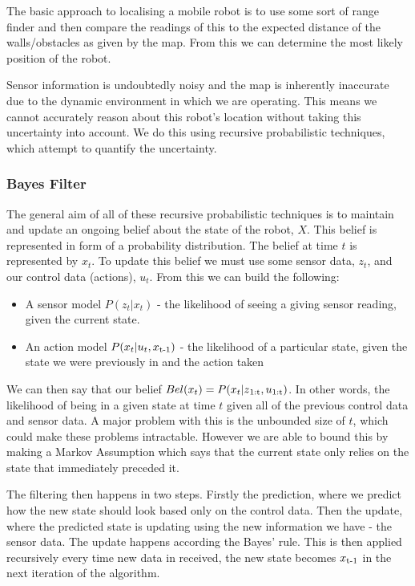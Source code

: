 The basic approach to localising a mobile robot is to use some sort of range finder and then compare the readings of this to the expected distance of the walls/obstacles as given by the map. From this we can determine the most likely position of the robot. 

Sensor information is undoubtedly noisy and the map is inherently inaccurate due to the dynamic environment in which we are operating. This means we cannot accurately reason about this robot’s location without taking this uncertainty into account. We do this using recursive probabilistic techniques, which attempt to quantify the uncertainty.
\subsubsection{Bayes Filter}

The general aim of all of these recursive probabilistic techniques is to maintain and update an ongoing belief about the state of the robot, $X$. This belief is represented in form of a probability distribution. The belief at time $t$ is represented by $x_t$. To update this belief we must use some sensor data, $z_t$, and our control data (actions), $u_t$. From this we can build the following:

\begin{itemize}
\item A sensor model $P(z_t|x_t)$ - the likelihood of seeing a giving sensor reading, given the current state.
\item An action model $P(x_t|u_t,x\textsubscript{t-1})$ - the likelihood of a particular state, given the state we were previously in and the action taken
\end{itemize}
 
We can then say that our belief $Bel(x_t) = P(x_t| z\textsubscript{1:t}, u\textsubscript{1:t})$. In other words, the likelihood of being in a given state at time $t$ given all of the previous control data and sensor data. A major problem with this is the unbounded size of $t$, which could make these problems intractable. However we are able to bound this by making a Markov Assumption which says that the current state only relies on the state that immediately preceded it.

The filtering then happens in two steps. Firstly the prediction, where we predict how the new state should look based only on the control data. Then the update, where the predicted state is updating using the new information we have - the sensor data. The update happens according the Bayes’ rule. This is then applied recursively every time new data in received, the new state becomes $x\textsubscript{t-1}$ in the next iteration of the algorithm.

